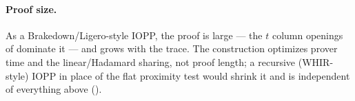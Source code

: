 \paragraph{Proof size.} As a Brakedown/Ligero-style IOPP, the proof is large ---
the $t$ column openings of  dominate it --- and grows with
the trace. The construction optimizes prover time and the linear/Hadamard
sharing, not proof length; a recursive (WHIR-style) IOPP in place of the flat
proximity test would shrink it and is independent of everything above
().
